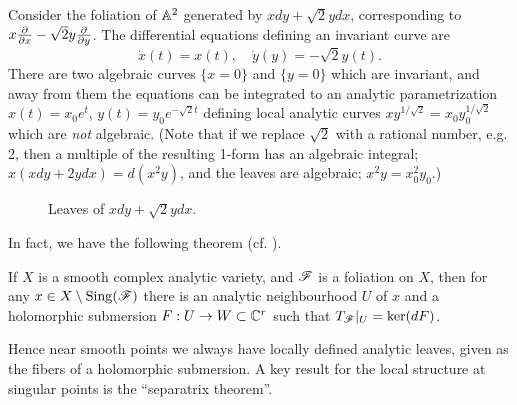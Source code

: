 \begin{example}\label{ex:irrational}
    Consider the foliation of $\mathbb{A}^2$ generated by $xdy+\sqrt2ydx$, corresponding
    to $x\pdv{}{x}-\sqrt2y\pdv{}{y}$. The differential equations defining an
    invariant curve are
    \begin{equation*}
        \dot x(t) = x(t), \quad \dot y(y)=-\sqrt2y(t).
    \end{equation*}
    There are two algebraic curves $\{x=0\}$ and $\{y=0\}$ which are invariant,
    and away from them the equations can be integrated to an analytic
    parametrization $x(t)=x_0e^t$, $y(t)=y_0e^{-\sqrt2t}$ defining local
    analytic curves $xy^{1/\sqrt2}=x_0y_0^{1/\sqrt2}$ which are \emph{not}
    algebraic. (Note that if we replace $\sqrt2$ with a rational number, e.g. 2,
    then a multiple of the resulting 1-form has an algebraic integral;
    $x(xdy+2ydx)=d(x^2y)$, and the leaves are algebraic; $x^2y=x_0^2y_0$.)
    \begin{figure}[H]
        \centering
        \caption{Leaves of $xdy+\sqrt{2}ydx$.}
        \label{fig:irrational}
    \end{figure}
\end{example}

In fact, we have the following theorem (cf. \cite[Thm 2.20]{voisin_book}).

\begin{theorem}[Frobenius]\label{thm:frobenius}
    If $X$ is a smooth complex analytic variety, and $\mathscr{F}$ is a foliation on
    $X$, then for any $x\in X\setminus\operatorname{Sing}(\mathscr{F})$ there is an analytic
    neighbourhood $U$ of $x$ and a holomorphic submersion $F:U\to W\subset\mathbb{C}^r$
    such that $T_{\mathscr{F}}|_U=\ker(dF)$.
\end{theorem}

Hence near smooth points we always have locally defined analytic leaves, given
as the fibers of a holomorphic submersion. A key result for the local structure
at singular points is the ``separatrix theorem''.

